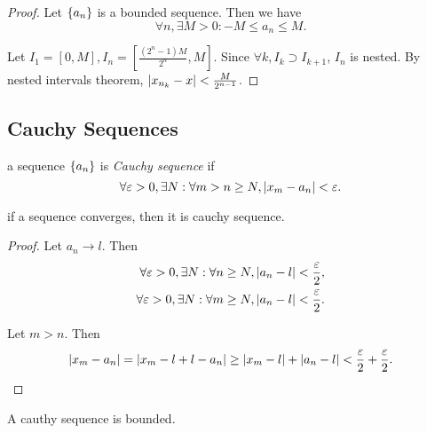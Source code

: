 \begin{proof}
  Let $\{a_n\}$ is a bounded sequence. Then we have
  \begin{equation}
    \forall n, \exists M > 0: -M \le a_n \le M.
  \end{equation}

  Let $I_1 = [0, M], I_n = [\frac{(2^n - 1)M}{2^n}, M]$. Since $\forall k, I_k
    \supset I_{k + 1}$, $I_n$ is nested. By nested intervals theorem,
  $\left| x_{n_k} - x \right| < \frac{M}{2^{n-1}}$.
\end{proof}


\subsection{Cauchy Sequences}

\begin{definition}
  a sequence $\{a_n\}$ is \emph{Cauchy sequence} if
  \begin{equation}
    \forall \varepsilon > 0, \exists N: \forall m > n \ge N, \left| x_m - a_n \right| < \varepsilon.
  \end{equation}
  \label{def:cauchy}
\end{definition}

\begin{theorem}
  if a sequence converges, then it is cauchy sequence.
  \label{thm:cauchy_conv}
\end{theorem}

\begin{proof}
  Let $a_n \to l$. Then
  \begin{equation}
    \begin{split}
      \forall \varepsilon > 0, \exists N: \forall n \ge N,
      \left| a_n - l \right| < \frac{\varepsilon}{2}, \\
      \forall \varepsilon > 0, \exists N: \forall m \ge N,
      \left| a_n - l \right| < \frac{\varepsilon}{2}.
    \end{split}
  \end{equation}

  Let $m > n$. Then
  \begin{equation}
    \left| x_m - a_n \right|
    =   \left| x_m - l + l - a_n \right|
    \ge \left| x_m - l \right| + \left| a_n - l \right|
    <   \frac{\varepsilon}{2} + \frac{\varepsilon}{2}.
  \end{equation}
\end{proof}

\begin{theorem}
  A cauthy sequence is bounded.
  \label{thm:cauchy_bound}
\end{theorem}

